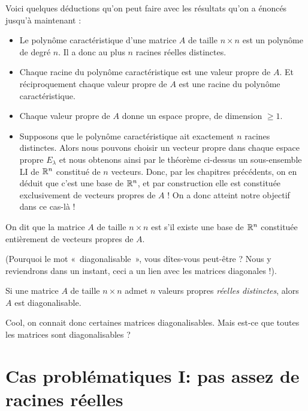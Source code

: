 Voici quelques déductions qu'on peut faire avec les résultats qu'on a énoncés jusqu'à maintenant :
\begin{itemize}
\item Le polynôme caractéristique d'une matrice $A$ de taille $n \times n$ est
un polynôme de degré $n$. Il a donc au plus $n$ racines réelles distinctes.
\item Chaque racine du polynôme caractéristique est une valeur propre de $A$. Et réciproquement chaque valeur propre de $A$ est une racine du polynôme caractéristique.
\item Chaque valeur propre de $A$ donne un espace propre, de dimension $\geq1$.
\item Supposons que le polynôme caractéristique ait exactement $n$ racines distinctes. Alors nous pouvons choisir un vecteur propre dans chaque espace propre $E_\lambda$
et nous obtenons ainsi par le théorème ci-dessus un sous-ensemble LI de $\mathbb{R}^n$ constitué de $n$ vecteurs. Donc, par les chapitres précédents, on en déduit que c'est
une base de $\mathbb{R}^n$, et par construction elle est constituée exclusivement de vecteurs propres
de $A$ ! On a donc atteint notre objectif dans ce cas-là !
\end{itemize}

\begin{definition}\label{diagble}
On dit que la matrice $A$ de taille $n \times n$ est  s'il existe
une base de $\mathbb{R}^n$ constituée entièrement de vecteurs propres de $A$.
\end{definition}

(Pourquoi le mot «~diagonalisable~», vous dîtes-vous peut-être ? Nous y reviendrons dans un instant, ceci a un lien avec les matrices diagonales !).

\begin{fac} Si une matrice $A$ de taille $n\times n$ admet $n$ valeurs propres
{\it réelles distinctes}, alors $A$ est diagonalisable.\end{fac}

Cool, on connait donc certaines matrices diagonalisables. Mais est-ce que toutes les matrices sont diagonalisables ?
 
\section{Cas problématiques I: pas assez de racines réelles}

